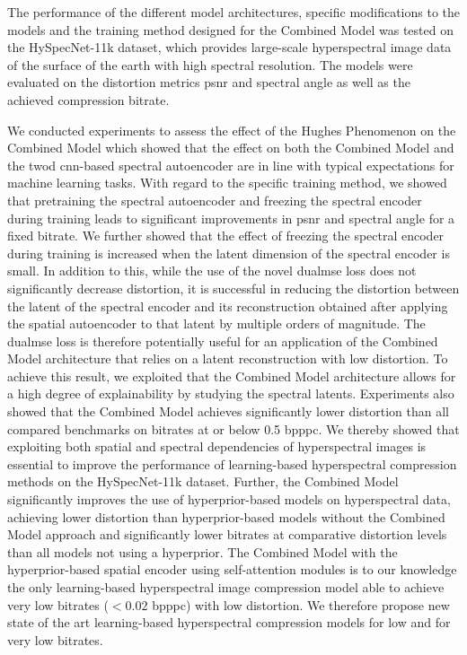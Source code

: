 The performance of the different model architectures, specific modifications to the models and the training method designed for the Combined Model was tested on the HySpecNet-11k dataset, which provides large-scale hyperspectral image data of the surface of the earth with high spectral resolution. The models were evaluated on the distortion metrics \ac{psnr} and spectral angle as well as the achieved compression bitrate.

We conducted experiments to assess the effect of the Hughes Phenomenon on the Combined Model which showed that the effect on both the Combined Model and the \ac{twod} \ac{cnn}-based spectral autoencoder are in line with typical expectations for machine learning tasks. With regard to the specific training method, we showed that pretraining the spectral autoencoder and freezing the spectral encoder during training leads to significant improvements in \ac{psnr} and spectral angle for a fixed bitrate. We further showed that the effect of freezing the spectral encoder during training is increased when the latent dimension of the spectral encoder is small. In addition to this, while the use of the novel \ac{dualmse} loss does not significantly decrease distortion, it is successful in reducing the distortion between the latent of the spectral encoder and its reconstruction obtained after applying the spatial autoencoder to that latent by multiple orders of magnitude. The \ac{dualmse} loss is therefore potentially useful for an application of the Combined Model architecture that relies on a latent reconstruction with low distortion. To achieve this result, we exploited that the Combined Model architecture allows for a high degree of explainability by studying the spectral latents. Experiments also showed that the Combined Model achieves significantly lower distortion than all compared benchmarks on bitrates at or below 0.5 bpppc. We thereby showed that exploiting both spatial and spectral dependencies of hyperspectral images is essential to improve the performance of learning-based hyperspectral compression methods on the HySpecNet-11k dataset. Further, the Combined Model significantly improves the use of hyperprior-based models on hyperspectral data, achieving lower distortion than hyperprior-based models without the Combined Model approach and significantly lower bitrates at comparative distortion levels than all models not using a hyperprior. The Combined Model with the hyperprior-based spatial encoder using self-attention modules is to our knowledge the only learning-based hyperspectral image compression model able to achieve very low bitrates ($<0.02$ \ac{bpppc}) with low distortion. We therefore propose new state of the art learning-based hyperspectral compression models for low and for very low bitrates.


